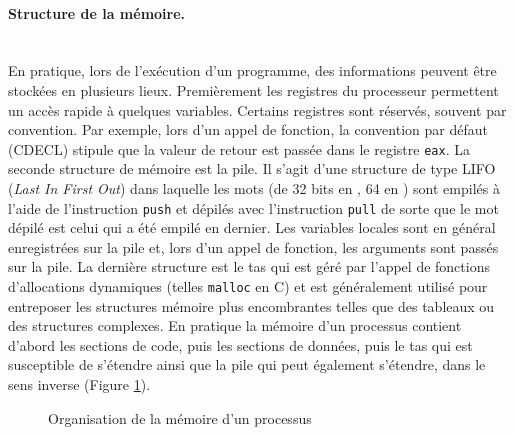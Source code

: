 \paragraph{Structure de la mémoire.}~\\
En pratique, lors de l'exécution d'un programme, des informations peuvent être stockées en plusieurs lieux. 
Premièrement les registres du processeur permettent un accès rapide à quelques variables.
Certains registres sont réservés, souvent par convention. Par exemple, lors d'un appel de fonction, la convention par défaut (CDECL) stipule que la valeur de retour est passée dans le registre \texttt{eax}.
La seconde structure de mémoire est la pile. 
Il s'agit d'une structure de type LIFO (\emph{Last In First Out}) dans laquelle les mots (de 32 bits en \xq, 64 en \xs) sont empilés à l'aide de l'instruction \texttt{push} et dépilés avec l'instruction \texttt{pull} de sorte que le mot dépilé est celui qui a été empilé en dernier.
Les variables locales sont en général enregistrées sur la pile et, lors d'un appel de fonction, les arguments sont passés sur la pile.
La dernière structure est le tas qui est géré par l'appel de fonctions d'allocations dynamiques (telles \texttt{malloc} en C) et est généralement utilisé pour entreposer les structures mémoire plus encombrantes telles que des tableaux ou des structures complexes.
En pratique la mémoire d'un processus contient d'abord les sections de code, puis les sections de données, puis le tas qui est susceptible de s'étendre ainsi que la pile qui peut également s'étendre, dans le sens inverse (Figure \ref{fig:mem_process}).

\begin{figure}
\begin{center}
\end{center}
\caption{Organisation de la mémoire d'un processus}
\label{fig:mem_process}
\end{figure}




